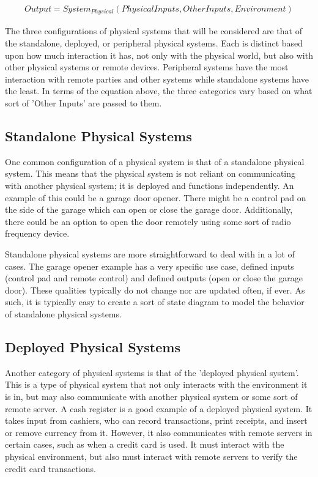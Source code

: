 \begin{align*}
Output = System_{Physical}(Physical Inputs, Other Inputs, Environment)
\end{align*}

The three configurations of physical systems that will be considered are that of the standalone, deployed, or peripheral physical
systems. Each is distinct based upon how much interaction it has, not only with the physical world, but also with other physical
systems or remote devices. Peripheral systems have the most interaction with remote parties and other systems while standalone
systems have the least. In terms of the equation above, the three categories vary based on what sort of 'Other Inputs' are passed
to them.

\subsection{Standalone Physical Systems}
One common configuration of a physical system is that of a standalone physical system. This means that the
physical system is not reliant on communicating with another physical system; it is deployed and functions
independently. An example of this could be a garage door opener. There might be a control pad on the side of the
garage which can open or close the garage door. Additionally, there could be an option to open the door remotely
using some sort of radio frequency device.

Standalone physical systems are more straightforward to deal with in a lot of cases. The garage opener example has
a very specific use case, defined inputs (control pad and remote control) and defined outputs (open or close the garage
door). These qualities typically do not change nor are updated often, if ever. As such, it is typically easy to create a sort
of state diagram to model the behavior of standalone physical systems.

\subsection{Deployed Physical Systems}
Another category of physical systems is that of the 'deployed physical system'. This is a type of physical system that not only
interacts with the environment it is in, but may also communicate with another physical system or some sort of remote
server. A cash register is a good example of a deployed physical system. It takes input from cashiers, who can record transactions,
print receipts, and insert or remove currency from it. However, it also communicates with remote servers in certain cases, such
as when a credit card is used. It must interact with the physical environment, but also must interact with remote servers to verify
the credit card transactions.


